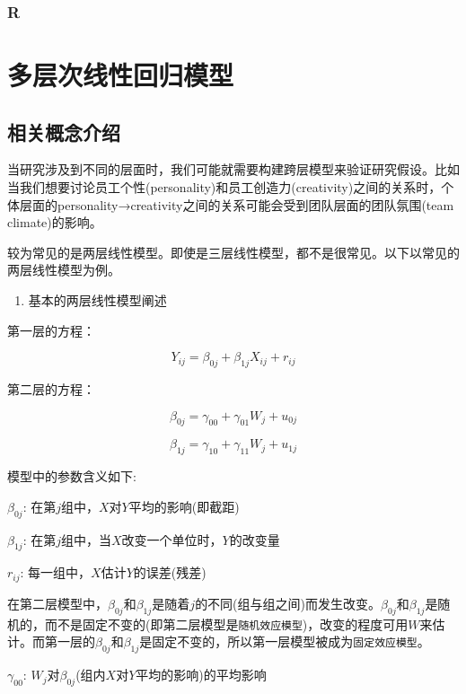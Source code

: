 \documentclass[
]{book}
\providecommand{\tightlist}{%
  \setlength{\itemsep}{0pt}\setlength{\parskip}{0pt}}
\begin{document}
\hypertarget{r}{%
\subsection{R}\label{r}}

\hypertarget{multilevel}{%
\chapter{多层次线性回归模型}\label{multilevel}}

\hypertarget{multiconcept}{%
\section{相关概念介绍}\label{multiconcept}}

当研究涉及到不同的层面时，我们可能就需要构建跨层模型来验证研究假设。比如当我们想要讨论员工个性(personality)和员工创造力(creativity)之间的关系时，个体层面的personality→creativity之间的关系可能会受到团队层面的团队氛围(team climate)的影响。

较为常见的是两层线性模型。即使是三层线性模型，都不是很常见。以下以常见的两层线性模型为例。

\begin{enumerate}
\def\labelenumi{\arabic{enumi}.}
\tightlist
\item
  基本的两层线性模型阐述
\end{enumerate}

第一层的方程：

\[
Y_{ij} = \beta_{0j} + \beta_{1j}X_{ij} + r_{ij}
\]

第二层的方程：

\[
\beta_{0j} = \gamma_{00} + \gamma_{01}W_j + u_{0j}
\]

\[
\beta_{1j} = \gamma_{10} + \gamma_{11}W_j + u_{1j}
\]

模型中的参数含义如下:

\(\beta_{0j}\): 在第\(j\)组中，\(X\)对\(Y\)平均的影响(即截距)

\(\beta_{1j}\): 在第\(j\)组中，当\(X\)改变一个单位时，\(Y\)的改变量

\(r_{ij}\): 每一组中，\(X\)估计\(Y\)的误差(残差)

在第二层模型中，\(\beta_{0j}\)和\(\beta_{1j}\)是随着\(j\)的不同(组与组之间)而发生改变。\(\beta_{0j}\)和\(\beta_{1j}\)是随机的，而不是固定不变的(即第二层模型是\texttt{随机效应模型})，改变的程度可用\(W\)来估计。而第一层的\(\beta_{0j}\)和\(\beta_{1j}\)是固定不变的，所以第一层模型被成为\texttt{固定效应模型}。

\(\gamma_{00}\): \(W_j\)对\(\beta_{0j}\)(组内\(X\)对\(Y\)平均的影响)的平均影响
\end{document}
